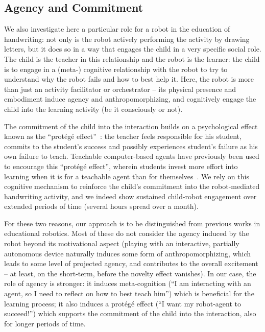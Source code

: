 \documentclass{article}
\begin{document}
\subsection{Agency and Commitment}

We also investigate here a particular role for a robot in the education of
handwriting: not only is the robot actively performing the activity by drawing
letters, but it does so in a way that engages the child in a very specific
social role. The child is the teacher in this relationship and the robot is the
learner: the child is to engage in a (meta-) cognitive relationship with the
robot to try to understand why the robot fails and how to best help it.  Here,
the robot is more than just an activity facilitator or orchestrator -- its
physical presence and embodiment induce agency and anthropomorphizing, and
cognitively engage the child into the learning activity (be it consciously or
not).

The commitment of the child into the interaction builds on a psychological effect
known as the ``protégé effect''~\cite{Chase2009}: the teacher feels responsible
for his student, commits to the student's success and possibly experiences
student's failure as his own failure to teach. Teachable computer-based agents
have previously been used to encourage this ``protégé effect'', wherein students
invest more effort into learning when it is for a teachable agent than for
themselves~\cite{Chase2009}.  We rely on this cognitive mechanism to reinforce
the child's commitment into the robot-mediated handwriting activity, and we
indeed show sustained child-robot engagement over extended periods of time
(several hours spread over a month).

For these two reasons, our approach is to be distinguished from previous works
in educational robotics. Most of these do not consider the agency induced by the
robot beyond its motivational aspect (playing with an interactive, partially
autonomous device naturally induces some form of anthropomorphizing, which leads
to some level of projected agency, and contributes to the overall excitement -- at
least, on the short-term, before the novelty effect vanishes).  In our case, the
role of agency is stronger: it induces meta-cognition (``I am interacting with
an agent, so I need to reflect on how to best teach him'') which is beneficial
for the learning process; it also induces a protégé effect (``I want my
robot-agent to succeed!'') which supports the commitment of the child into the
interaction, also for longer periods of time.
\end{document}
